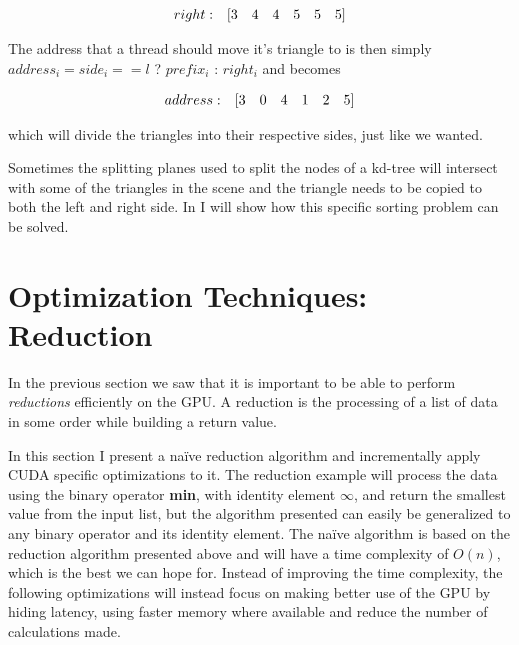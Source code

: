 \begin{displaymath}
  \begin{array} {r r r r r r r}
    right: & [3 & 4 & 4 & 5 & 5 & 5]
  \end{array}
\end{displaymath}

The address that a thread should move it's triangle to is then simply
$address_i = side_i == l$ ? $prefix_i$ : $right_i$ and becomes


\begin{displaymath}
  \begin{array} {r r r r r r r}
    address: & [3 & 0 & 4 & 1 & 2 & 5]
  \end{array}
\end{displaymath}

which will divide the triangles into their respective sides, just like
we wanted.

Sometimes the splitting planes used to split the nodes of a kd-tree will
intersect with some of the triangles in the scene and the triangle needs to be
copied to both the left and right side. In  I will
show how this specific sorting problem can be solved.





\section{Optimization Techniques: Reduction}\label{sec:reduce}



In the previous section we saw that it is important to be able to perform
\textit{reductions} efficiently on the GPU. A reduction is the processing of a
list of data in some order while building a return value.


In this section I present a naïve reduction algorithm and incrementally apply
CUDA specific optimizations to it. The reduction example will process the data
using the binary operator \textbf{min}, with identity element $\infty$, and
return the smallest value from the input list, but the algorithm presented can
easily be generalized to any binary operator and its identity element. The naïve
algorithm is based on the reduction algorithm presented above and will have a
time complexity of $O(n)$, which is the best we can hope for. Instead of
improving the time complexity, the following optimizations will instead focus on
making better use of the GPU by hiding latency, using faster memory where
available and reduce the number of calculations made.

